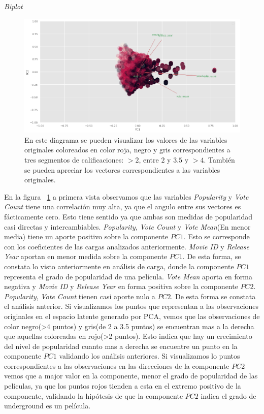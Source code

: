 \documentclass[11pt,a4paper,twoside]{thesis}
\begin{document}
\clearpage


\begin{description}
	\item[\textit{Biplot}]
\end{description}

\begin{figure}[h!]
	\centering
	\includegraphics[width=15cm]{./images/PCA-biplot.png}
	\caption{En este diagrama se pueden visualizar los valores de las variables originales coloreados en color roja, negro y gris correspondientes a tres segmentos de calificaciones: $>2$, entre $2$ y $3.5$ y $>4$. También se pueden apreciar los vectores correspondientes a las variables originales.}
	\label{fig:biplot}
\end{figure}


En la figura ~\ref{fig:biplot} a primera vista observamos que las variables \textit{Popularity} y \textit{Vote Count} tiene una correlación muy alta, ya que el angulo entre sus vectores es fácticamente cero. Esto tiene sentido ya que ambas son medidas de popularidad casi directas y intercambiables. \textit{Popularity}, \textit{Vote Count} y \textit{Vote Mean}(En menor media) tiene un aporte positivo sobre la componente $PC1$. Esto se corresponde con los coeficientes de las cargas analizados anteriormente. \textit{Movie ID } y \textit{Release Year} aportan en menor medida sobre la componente $PC1$. De esta forma, se constata lo visto anteriormente en análisis de carga, donde la componente $PC1$ representa el grado de popularidad de una película. \textit{Vote Mean} aporta en forma negativa y \textit{Movie ID } y \textit{Release Year} en forma positiva sobre la componente $PC2$. \textit{Popularity}, \textit{Vote Count} tienen casi aporte nulo a $PC2$. De esta forma se constata el análisis anterior. Si visualizamos los puntos que representan a las observaciones originales en el espacio latente generado por PCA, vemos que las observaciones de color negro(>4 puntos) y gris(de 2 a 3.5 puntos) se encuentran mas a la derecha que aquellas coloreadas en rojo(>2 puntos). Esto indica que hay un crecimiento del nivel de popularidad cuanto mas a derecha se encuentre un punto en la componente $PC1$ validando los análisis anteriores. Si visualizamos lo puntos correspondientes a las observaciones en las direcciones de la componente $PC2$ vemos que a major valor en la componente, menor el grado de popularidad de las películas, ya que los puntos rojos tienden a esta en el extremo positivo de la componente, validando la hipótesis de que la componente $PC2$ indica el grado de underground es un película.
\end{document}
